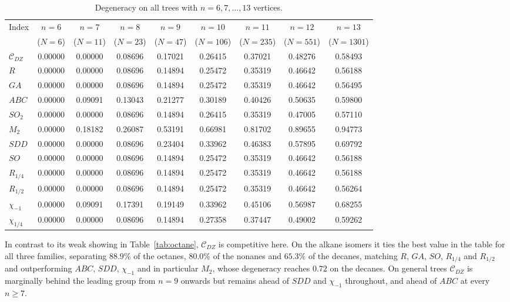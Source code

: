 \documentclass[11pt,a4paper]{article}
\theoremstyle{plain}
\theoremstyle{definition}
\theoremstyle{remark}
\newcommand{\CDZ}{\mathcal{C}_{DZ}}
\begin{document}
\begin{table}[htbp]
\centering
\small
\setlength{\tabcolsep}{4pt}
\caption{Degeneracy on all trees with $n=6,7,\dots,13$ vertices.}
\label{tab:degeneracy-trees}
\begin{tabular}{lcccccccc}
\toprule
Index & $n{=}6$ & $n{=}7$ & $n{=}8$ & $n{=}9$ & $n{=}10$ & $n{=}11$ & $n{=}12$ & $n{=}13$ \\
      & ($N{=}6$) & ($N{=}11$) & ($N{=}23$) & ($N{=}47$) & ($N{=}106$) & ($N{=}235$) & ($N{=}551$) & ($N{=}1301$) \\
\midrule
$\CDZ$       & 0.00000 & 0.00000 & 0.08696 & 0.17021 & 0.26415 & 0.37021 & 0.48276 & 0.58493 \\
$R$          & 0.00000 & 0.00000 & 0.08696 & 0.14894 & 0.25472 & 0.35319 & 0.46642 & 0.56188 \\
$GA$         & 0.00000 & 0.00000 & 0.08696 & 0.14894 & 0.25472 & 0.35319 & 0.46642 & 0.56495 \\
$ABC$        & 0.00000 & 0.09091 & 0.13043 & 0.21277 & 0.30189 & 0.40426 & 0.50635 & 0.59800 \\
$SO_2$       & 0.00000 & 0.00000 & 0.08696 & 0.14894 & 0.26415 & 0.35319 & 0.47005 & 0.57110 \\
$M_2$        & 0.00000 & 0.18182 & 0.26087 & 0.53191 & 0.66981 & 0.81702 & 0.89655 & 0.94773 \\
$SDD$        & 0.00000 & 0.00000 & 0.08696 & 0.23404 & 0.33962 & 0.46383 & 0.57895 & 0.69792 \\
$SO$         & 0.00000 & 0.00000 & 0.08696 & 0.14894 & 0.25472 & 0.35319 & 0.46642 & 0.56188 \\
$R_{1/4}$    & 0.00000 & 0.00000 & 0.08696 & 0.14894 & 0.25472 & 0.35319 & 0.46642 & 0.56188 \\
$R_{1/2}$    & 0.00000 & 0.00000 & 0.08696 & 0.14894 & 0.25472 & 0.35319 & 0.46642 & 0.56264 \\
$\chi_{-1}$  & 0.00000 & 0.09091 & 0.17391 & 0.19149 & 0.33962 & 0.45106 & 0.56987 & 0.68255 \\
$\chi_{1/4}$ & 0.00000 & 0.00000 & 0.08696 & 0.14894 & 0.27358 & 0.37447 & 0.49002 & 0.59262 \\
\bottomrule
\end{tabular}
\end{table}

In contrast to its weak showing in Table~\ref{tab:octane}, $\CDZ$ is competitive
here. On the alkane isomers it ties the best value in the table for all three
families, separating $88.9\%$ of the octanes, $80.0\%$ of the nonanes and
$65.3\%$ of the decanes, matching $R$, $GA$, $SO$, $R_{1/4}$ and $R_{1/2}$ and
outperforming $ABC$, $SDD$, $\chi_{-1}$ and in particular $M_2$, whose degeneracy
reaches $0.72$ on the decanes. On general trees $\CDZ$ is marginally behind the
leading group from $n=9$ onwards but remains ahead of $SDD$ and $\chi_{-1}$
throughout, and ahead of $ABC$ at every $n\ge7$.
\end{document}
